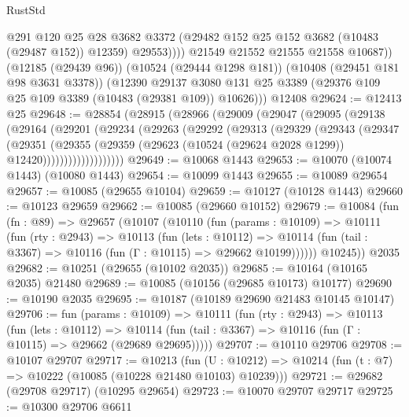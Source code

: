 \begin{lexlean}{RustStd}
\begin{coremodule}
                  @291
                  @120
                  @25
                  @28
                  @3682
                  @3372
                  (@29482 @152 @25 @152 @3682 (@10483 (@29487 @152)) @12359)
                  @29553))))
          @21549
          @21552
          @21555
          @21558
          @10687))
      (@12185 (@29439 @96))
      (@10524 (@29444 @1298 @181))
      (@10408 (@29451 @181 @98 @3631 @3378))
      (@12390
        @29137
        @3080
        @131
        @25
        @3389
        (@29376 @109 @25 @109 @3389 (@10483 (@29381 @109)) @10626)))
    @12408
@29624 := @12413 @25
@29648 := @28854
    (@28915
      (@28966
        (@29009
          (@29047
            (@29095
              (@29138
                (@29164
                  (@29201
                    (@29234
                      (@29263
                        (@29292
                          (@29313
                            (@29329
                              (@29343
                                (@29347
                                  (@29351
                                    (@29355
                                      (@29359
                                        (@29623
                                          (@10524 (@29624 @2028 @1299))
                                          @12420)))))))))))))))))))
@29649 := @10068 @1443
@29653 := @10070 (@10074 @1443) (@10080 @1443)
@29654 := @10099 @1443
@29655 := @10089 @29654
@29657 := @10085 (@29655 @10104)
@29659 := @10127 (@10128 @1443)
@29660 := @10123 @29659
@29662 := @10085 (@29660 @10152)
@29679 := @10084
    (fun (fn : @89) =>
    @29657
      (@10107
        (@10110
          (fun (params : @10109) =>
          @10111
            (fun (rty : @2943) =>
            @10113
              (fun (lets : @10112) =>
              @10114 (fun (tail : @3367) => @10116 (fun (Γ : @10115) => @29662 @10199))))))
        @10245))
    @2035
@29682 := @10251 (@29655 (@10102 @2035))
@29685 := @10164 (@10165 @2035) @21480
@29689 := @10085 (@10156 (@29685 @10173) @10177)
@29690 := @10190 @2035
@29695 := @10187 (@10189 @29690 @21483 @10145 @10147)
@29706 := fun (params : @10109) =>
  @10111
    (fun (rty : @2943) =>
    @10113
      (fun (lets : @10112) =>
      @10114 (fun (tail : @3367) => @10116 (fun (Γ : @10115) => @29662 (@29689 @29695)))))
@29707 := @10110 @29706
@29708 := @10107 @29707
@29717 := @10213
    (fun (U : @10212) => @10214 (fun (t : @7) => @10222 (@10085 (@10228 @21480 @10103) @10239)))
@29721 := @29682 (@29708 @29717) (@10295 @29654)
@29723 := @10070 @29707 @29717
@29725 := @10300 @29706 @6611

\end{coremodule}
\end{lexlean}
